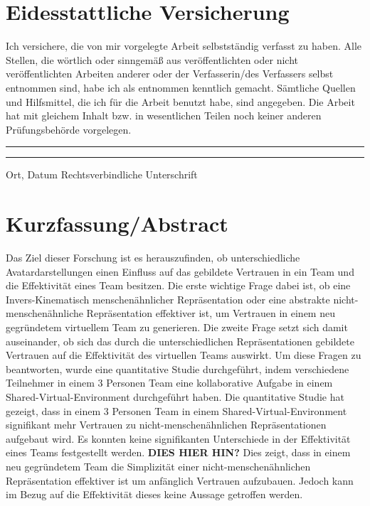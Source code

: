 \documentclass[a4paper,11pt]{article}%
\renewcommand{\\}{\vspace*{0.5\baselineskip} \newline}
\begin{document}
\section*{Eidesstattliche Versicherung}
	Ich versichere, die von mir vorgelegte Arbeit selbstständig verfasst zu haben. Alle Stellen, die wörtlich oder sinngemäß aus veröffentlichten oder nicht veröffentlichten Arbeiten anderer oder der Verfasserin/des Verfassers selbst entnommen sind, habe ich als entnommen kenntlich gemacht. Sämtliche Quellen und Hilfsmittel, die ich für die Arbeit benutzt habe, sind angegeben. Die Arbeit hat mit gleichem Inhalt bzw. in wesentlichen Teilen noch keiner anderen Prüfungsbehörde vorgelegen.\\
	~\\
	~\\
	\rule{0.35\textwidth}{0.4pt} \hspace*{3cm} \rule{0.45\textwidth}{0.4pt} \newline
	Ort, Datum	\hspace*{6.3cm}	Rechtsverbindliche Unterschrift
	\newpage
\section*{Kurzfassung/Abstract}
Das Ziel dieser Forschung ist es herauszufinden, ob unterschiedliche Avatardarstellungen einen Einfluss auf das gebildete Vertrauen in ein Team und die Effektivität eines Team besitzen.
Die erste wichtige Frage dabei ist, ob eine Invers-Kinematisch menschenähnlicher Repräsentation oder eine abstrakte nicht-menschenähnliche Repräsentation effektiver ist, um Vertrauen in einem neu gegründetem virtuellem Team zu generieren. Die zweite Frage setzt sich damit auseinander, ob sich das durch die unterschiedlichen Repräsentationen gebildete Vertrauen auf die Effektivität des virtuellen Teams auswirkt.
Um diese Fragen zu beantworten, wurde eine quantitative Studie durchgeführt, indem verschiedene Teilnehmer in einem 3 Personen Team eine kollaborative Aufgabe in einem Shared-Virtual-Environment durchgeführt haben.
Die quantitative Studie hat gezeigt, dass in einem 3 Personen Team in einem Shared-Virtual-Environment signifikant mehr Vertrauen zu nicht-menschenähnlichen Repräsentationen aufgebaut wird. Es konnten keine signifikanten Unterschiede in der Effektivität eines Teams festgestellt werden.
\textbf{DIES HIER HIN?}
Dies zeigt, dass in einem neu gegründetem Team die Simplizität einer nicht-menschenähnlichen Repräsentation effektiver ist um anfänglich Vertrauen aufzubauen. Jedoch kann im Bezug auf die Effektivität dieses keine Aussage getroffen werden.
	
\end{document}
